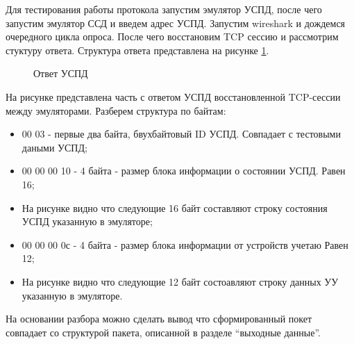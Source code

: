 Для тестирования работы протокола запустим эмулятор УСПД, после чего запустим эмулятор ССД и введем адрес УСПД. Запустим wireshark и дождемся очередного цикла опроса. После чего восстановим TCP сессию и рассмотрим стуктуру ответа. Структура ответа представлена на рисунке \ref{img:test_pachete}.

\begin{figure}[ht!]
 \caption{Ответ УСПД}
 \label{img:test_pachete}
\end{figure}

На рисунке представлена часть с ответом УСПД восстановленной TCP-сессии между эмуляторами. Разберем структура по байтам:

\begin{itemize}
 \item 00 03 - первые два байта, бвухбайтовый ID УСПД. Совпадает с тестовыми даными УСПД;
 \item 00 00 00 10 - 4 байта - размер блока информации о состоянии УСПД. Равен 16;
 \item На рисунке видно что следующие 16 байт составляют строку состояния УСПД указанную в эмуляторе;
 \item 00 00 00 0с - 4 байта - размер блока информации от устройств учетаю Равен 12;
 \item На рисунке видно что следующие 12 байт состоавляют строку данных УУ указанную в эмуляторе.
\end{itemize}

На основании разбора можно сделать вывод что сформированный покет совпадает со структурой пакета, описанной в разделе ``выходные данные''.